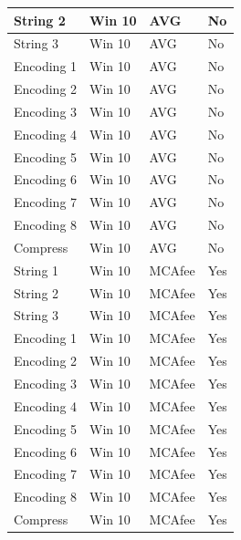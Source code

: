 \documentclass{article}%
\begin{document}
\begin{table}[]
\begin{center}
\begin{tabular}{|l|l|l|l|}
String 2             & Win 10      & AVG              & No                \\ \hline
String 3             & Win 10      & AVG              & No                \\ \hline
Encoding 1           & Win 10      & AVG              & No                \\ \hline
Encoding 2           & Win 10      & AVG              & No                \\ \hline
Encoding 3           & Win 10      & AVG              & No                \\ \hline
Encoding 4           & Win 10      & AVG              & No                \\ \hline
Encoding 5           & Win 10      & AVG              & No                \\ \hline
Encoding 6           & Win 10      & AVG              & No                \\ \hline
Encoding 7           & Win 10      & AVG              & No                \\ \hline
Encoding 8           & Win 10      & AVG              & No                \\ \hline
Compress             & Win 10      & AVG              & No                \\ \hline
String 1             & Win 10      & MCAfee          & Yes               \\ \hline
String 2             & Win 10      & MCAfee          & Yes               \\ \hline
String 3             & Win 10      & MCAfee          & Yes               \\ \hline
Encoding 1           & Win 10      & MCAfee          & Yes               \\ \hline
Encoding 2           & Win 10      & MCAfee          & Yes               \\ \hline
Encoding 3           & Win 10      & MCAfee          & Yes               \\ \hline
Encoding 4           & Win 10      & MCAfee          & Yes               \\ \hline
Encoding 5           & Win 10      & MCAfee          & Yes               \\ \hline
Encoding 6           & Win 10      & MCAfee          & Yes               \\ \hline
Encoding 7           & Win 10      & MCAfee          & Yes               \\ \hline
Encoding 8           & Win 10      & MCAfee          & Yes               \\ \hline
Compress             & Win 10      & MCAfee          & Yes               \\ \hline
\end{tabular}
\end{center}
\end{table}
\end{document}
